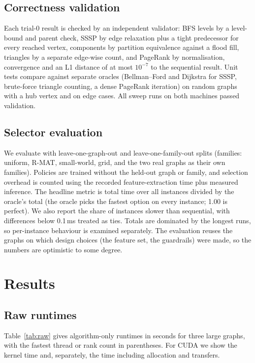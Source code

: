 \documentclass[conference]{IEEEtran}
\begin{document}
\subsection{Correctness validation}
Each trial-0 result is checked by an independent validator: BFS levels by a level-bound and parent check, SSSP by edge relaxation plus a tight predecessor for every reached vertex, components by partition equivalence against a flood fill, triangles by a separate edge-wise count, and PageRank by normalisation, convergence and an L1 distance of at most $10^{-7}$ to the sequential result. Unit tests compare against separate oracles (Bellman--Ford and Dijkstra for SSSP, brute-force triangle counting, a dense PageRank iteration) on random graphs with a hub vertex and on edge cases. All sweep runs on both machines passed validation.

\subsection{Selector evaluation}
We evaluate with leave-one-graph-out and leave-one-family-out splits (families: uniform, R-MAT, small-world, grid, and the two real graphs as their own families). Policies are trained without the held-out graph or family, and selection overhead is counted using the recorded feature-extraction time plus measured inference. The headline metric is total time over all instances divided by the oracle's total (the oracle picks the fastest option on every instance; 1.00 is perfect). We also report the share of instances slower than sequential, with differences below 0.1\,ms treated as ties. Totals are dominated by the longest runs, so per-instance behaviour is examined separately. The evaluation reuses the graphs on which design choices (the feature set, the guardrails) were made, so the numbers are optimistic to some degree.

\section{Results}
\subsection{Raw runtimes}
Table~\ref{tab:raw} gives algorithm-only runtimes in seconds for three large graphs, with the fastest thread or rank count in parentheses. For CUDA we show the kernel time and, separately, the time including allocation and transfers.
\end{document}

